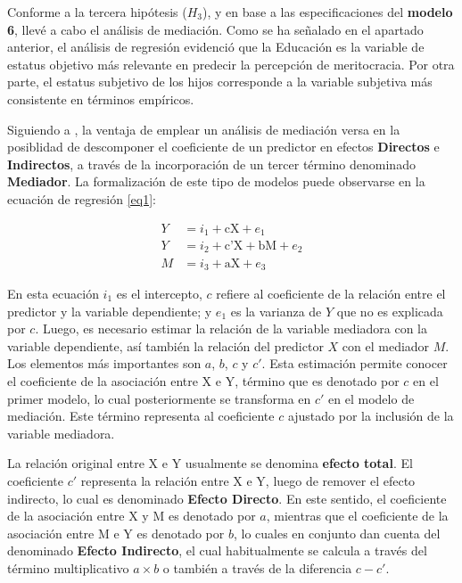 \documentclass[12pt]{article}
\begin{document}
Conforme a la tercera hipótesis ($H_3$), y en base a las especificaciones del \textbf{modelo 6}, llevé a cabo el análisis de mediación. Como se ha señalado en el apartado anterior, el análisis de regresión evidenció que la Educación es la variable de estatus objetivo más relevante en predecir la percepción de meritocracia. Por otra parte, el estatus subjetivo de los hijos corresponde a la variable subjetiva más consistente en términos empíricos. 

Siguiendo a \cite{Jose2013}, la ventaja de emplear un análisis de mediación versa en la posiblidad de descomponer el coeficiente de un predictor en efectos \textbf{Directos} e \textbf{Indirectos}, a través de la incorporación de un tercer término denominado \textbf{Mediador}. La formalización de este tipo de modelos puede observarse en la ecuación de regresión \ref{eq1}:

\begin{equation}
\begin{aligned}
\label{eq1}
Y &= i_1+ \text{cX}+ e_1\\
Y &= i_2+ \text{c'X} + \text{bM} + e_2 \\
M &= i_3+ \text{aX}+ e_3
\end{aligned}
\end{equation}

En esta ecuación $i_1$ es el intercepto, $c$ refiere al coeficiente de la relación entre el predictor y la variable dependiente; y $e_1$ es la varianza de $Y$ que no es explicada por $c$. Luego, es necesario estimar la relación de la variable mediadora con la variable dependiente, así también la relación del predictor $X$ con el mediador $M$. Los elementos más importantes son $a$, $b$, $c$ y $c'$. Esta estimación permite conocer el coeficiente de la asociación entre X e Y, término que es denotado por $c$ en el primer modelo, lo cual posteriormente se transforma en $c'$ en el modelo de mediación. Este término representa al coeficiente $c$ ajustado por la inclusión de la variable mediadora. 

La relación original entre X e Y usualmente se denomina \textbf{efecto total}. El coeficiente $c'$ representa la relación entre X e Y, luego de remover el efecto indirecto, lo cual es denominado \textbf{Efecto Directo}. En este sentido, el coeficiente de la asociación entre X y M es denotado por $a$, mientras que el coeficiente de la asociación entre M e Y es denotado por $b$, lo cuales en conjunto dan cuenta del denominado \textbf{Efecto Indirecto}, el cual habitualmente se calcula a través del término multiplicativo $a \times b$ o también a través de la diferencia  $c - c'$.
\end{document}
